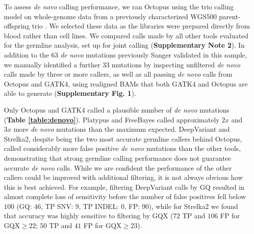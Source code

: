 \documentclass[notitlepage, twocolumn, 10pt]{article}
\begin{document}
\begin{table}[bp]
    \centering
    \caption{\textit{De novo} mutations called in WGS500 trio.}
    \label{table:denovo}
    \small
    \sffamily
\end{table}
To assess \textit{de novo} calling performance, we ran Octopus using the trio calling model on whole-genome data from a previously characterized WGS500 parent-offspring trio \cite{RN5}. We selected these data as the libraries were prepared directly from blood rather than cell lines. We compared calls made by all other tools evaluated for the germline analysis, set up for joint calling (\textbf{Supplementary Note 2}). In addition to the $63$ \textit{de novo} mutations previously Sanger validated in this sample, we manually identified a further $33$ mutations by inspecting unfiltered \textit{de novo} calls made by three or more callers, as well as all passing \textit{de novo} calls from Octopus and GATK4, using realigned BAMs that both GATK4 and Octopus are able to generate (\textbf{Supplementary Fig. 1}).

Only Octopus and GATK4 called a plausible number of \textit{de novo} mutations (\textbf{Table \ref{table:denovo}}). Platypus and FreeBayes called approximately $2x$ and $3x$ more \textit{de novo} mutations than the maximum expected. DeepVariant and Strelka2, despite being the two most accurate germline callers behind Octopus, called considerably more false positive \emph{de novo} mutations than the other tools, demonstrating that strong germline calling performance does not guarantee accurate \textit{de novo} calls. While we are confident the performance of the other callers could be improved with additional filtering, it is not always obvious how this is best achieved. For example, filtering DeepVariant calls by GQ resulted in almost complete loss of sensitivity before the number of false positives fell below $100$ (GQ: $46$, TP SNV: $9$, TP INDEL: $0$, FP: $90$), while for Strelka2 we found that accuracy was highly sensitive to filtering by GQX ($72$ TP and $106$ FP for $\text{GQX} \ge 22$; 
$50$ TP and $41$ FP for $\text{GQX} \ge 23$).
\end{document}
